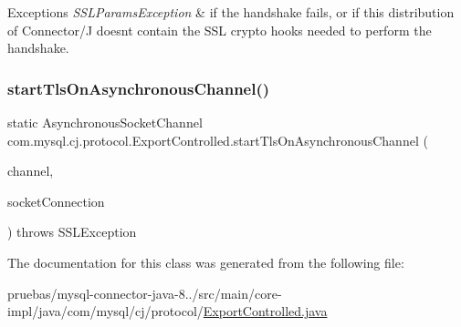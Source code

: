 \begin{DoxyExceptions}{Exceptions}
{\em S\+S\+L\+Params\+Exception} & if the handshake fails, or if this distribution of Connector/J doesn\textquotesingle{}t contain the S\+SL crypto hooks needed to perform the handshake. \\
\hline
\end{DoxyExceptions}
\mbox{\label{classcom_1_1mysql_1_1cj_1_1protocol_1_1_export_controlled_a0737e8a1422c8d2e5fa6fb9e4dd61caa}} 
\subsubsection{\texorpdfstring{start\+Tls\+On\+Asynchronous\+Channel()}{startTlsOnAsynchronousChannel()}}
{\footnotesize\ttfamily static Asynchronous\+Socket\+Channel com.\+mysql.\+cj.\+protocol.\+Export\+Controlled.\+start\+Tls\+On\+Asynchronous\+Channel (\begin{DoxyParamCaption}\item[{Asynchronous\+Socket\+Channel}]{channel,  }\item[{\mbox{\hyperlink{interfacecom_1_1mysql_1_1cj_1_1protocol_1_1_socket_connection}{Socket\+Connection}}}]{socket\+Connection }\end{DoxyParamCaption}) throws S\+S\+L\+Exception\hspace{0.3cm}{\ttfamily [static]}}



The documentation for this class was generated from the following file\+:\begin{DoxyCompactItemize}
\item 
pruebas/mysql-\/connector-\/java-\/8../src/main/core-\/impl/java/com/mysql/cj/protocol/\mbox{\hyperlink{_export_controlled_8java}{Export\+Controlled.\+java}}\end{DoxyCompactItemize}
